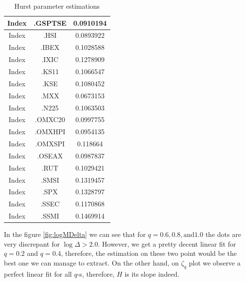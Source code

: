 \begin{table}[htbp]
\begin{tabular}{|c|c|c|}
                Index                    & .GSPTSE & 0.0910194 \\ \hline
                Index                    & .HSI & 0.0893922 \\ \hline
                Index                    & .IBEX & 0.1028588 \\ \hline
                Index                    & .IXIC & 0.1278909 \\ \hline
                Index                    & .KS11 & 0.1066547 \\ \hline
                Index                    & .KSE & 0.1080452 \\ \hline
                Index                    & .MXX & 0.0673153 \\ \hline
                Index                    & .N225 & 0.1063503 \\ \hline
                Index                    & .OMXC20 & 0.0997755 \\ \hline
                Index                    & .OMXHPI & 0.0954135 \\ \hline
                Index                    & .OMXSPI & 0.118664 \\ \hline
                Index                    & .OSEAX & 0.0987837 \\ \hline
                Index                    & .RUT & 0.1029421 \\ \hline
                Index                    & .SMSI & 0.1319457 \\ \hline
                Index                    & .SPX & 0.1328797 \\ \hline
                Index                    & .SSEC & 0.1170868 \\ \hline
                Index                    & .SSMI & 0.1469914 \\ \hline
            \end{tabular}
            \caption{Hurst parameter estimations}
            \label{table:hurst_est}
        \end{table}



        In the figure \ref{fig:logMDelta} we can see that for $q = 0.6, 0.8, \text{and} 1.0$ the dots are very discrepant for $\log\Delta > 2.0$. 
        However, we get a pretty decent linear fit for $q = 0.2$ and $q = 0.4$, therefore, the estimation on these two point would be the best one
        we can manage to extract. On the other hand, on $\zeta_q$ plot we observe a perfect linear fit for all $q$-s, therefore, $H$
        is its slope indeed.

